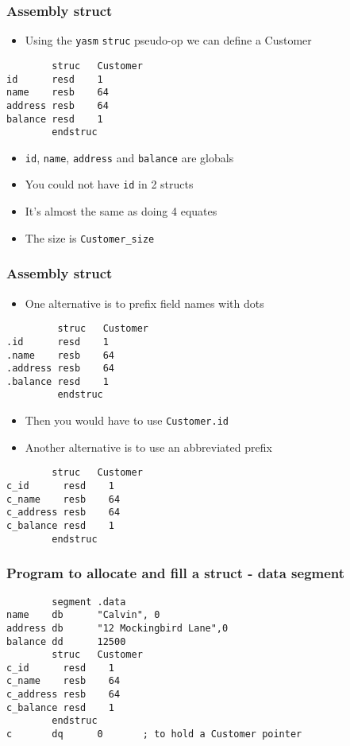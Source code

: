 \documentclass{beamer}
\begin{document}
\begin{frame}[fragile]
    \frametitle{Assembly struct}
    \begin{itemize}
        \item Using the {\tt yasm} {\tt struc} pseudo-op we can
              define a Customer
    \end{itemize}
\begin{verbatim}
        struc   Customer
id      resd    1
name    resb    64
address resb    64
balance resd    1
        endstruc
\end{verbatim}
    \begin{itemize}
        \item {\tt id}, {\tt name}, {\tt address} and {\tt balance} are
              globals
        \item You could not have {\tt id} in 2 structs
        \item It's almost the same as doing 4 equates
        \item The size is {\tt Customer\_size}
    \end{itemize}
\end{frame}

\begin{frame}[fragile]
    \frametitle{Assembly struct}
    \begin{itemize}
        \item One alternative is to prefix field names with dots
    \end{itemize}
\begin{verbatim}
         struc   Customer
.id      resd    1
.name    resb    64
.address resb    64
.balance resd    1
         endstruc
\end{verbatim}
    \begin{itemize}
        \item Then you would have to use {\tt Customer.id}
        \item Another alternative is to use an abbreviated prefix
    \end{itemize}
\begin{verbatim}
        struc   Customer
c_id      resd    1
c_name    resb    64
c_address resb    64
c_balance resd    1
        endstruc
\end{verbatim}
\end{frame}

\begin{frame}[fragile]
    \frametitle{Program to allocate and fill a struct - data segment}
\begin{verbatim}
        segment .data
name    db      "Calvin", 0
address db      "12 Mockingbird Lane",0
balance dd      12500
        struc   Customer
c_id      resd    1
c_name    resb    64
c_address resb    64
c_balance resd    1
        endstruc
c       dq      0       ; to hold a Customer pointer
\end{verbatim}
\end{frame}
\end{document}
